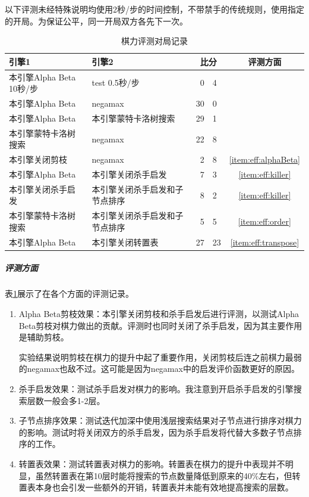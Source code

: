 \documentclass{ctexart}
\begin{document}
以下评测未经特殊说明均使用2秒/步的时间控制，不带禁手的传统规则，使用指定的开局。为保证公平，同一开局双方各先下一次。

\begin{table}
    \centering
    \begin{tabular}{l l | r @{:} l | c}
        \textbf{引擎1} & \textbf{引擎2} & \multicolumn{2}{c|}{\textbf{比分}} & \textbf{评测方面} \\
        \hline
        本引擎Alpha Beta 10秒/步 & test 0.5秒/步 & 0 & 4\\
        本引擎Alpha Beta & negamax & 30 & 0\\
        本引擎Alpha Beta & 本引擎蒙特卡洛树搜索 & 29 & 1\\
        本引擎蒙特卡洛树搜索 & negamax & 22 & 8\\
        本引擎关闭剪枝 & negamax & 2 & 8 & \ref{item:eff:alphaBeta}\\
        本引擎Alpha Beta & 本引擎关闭杀手启发 & 7 & 3 & \ref{item:eff:killer}\\
        本引擎关闭杀手启发 & 本引擎关闭杀手启发和子节点排序 & 8 & 2 & \ref{item:eff:killer}\\
        本引擎蒙特卡洛树搜索 & 本引擎关闭杀手启发和子节点排序 & 5 & 5 & \ref{item:eff:order}\\
        本引擎Alpha Beta & 本引擎关闭转置表 & 27 & 23 & \ref{item:eff:transpose}\\
    \end{tabular}
    \caption{棋力评测对局记录}
    \label{table:battleRecord}
\end{table}

\subparagraph{评测方面} 表\ref{table:battleRecord}展示了在各个方面的评测记录。
\begin{enumerate}
    \item \label{item:eff:alphaBeta} Alpha Beta剪枝效果：本引擎关闭剪枝和杀手启发后进行评测，以测试Alpha Beta剪枝对棋力做出的贡献。评测时也同时关闭了杀手启发，因为其主要作用是辅助剪枝。
    
    实验结果说明剪枝在棋力的提升中起了重要作用，关闭剪枝后连之前棋力最弱的negamax也敌不过。这可能是因为negamax中的启发评价函数更好的原因。

    \item \label{item:eff:killer} 杀手启发效果：测试杀手启发对棋力的影响。我注意到开启杀手启发的引擎搜索层数一般会多1-2层。
    \item \label{item:eff:order} 子节点排序效果：测试迭代加深中使用浅层搜索结果对子节点进行排序对棋力的影响。测试时将关闭双方的杀手启发，因为杀手启发将代替大多数子节点排序的工作。
    \item \label{item:eff:transpose} 转置表效果：测试转置表对棋力的影响。转置表在棋力的提升中表现并不明显，虽然转置表在第10层时能将搜索的节点数量降低到原来的40\%左右，但转置表本身也会引发一些额外的开销，转置表并未能有效地提高搜索的层数。
\end{enumerate}
\end{document}
